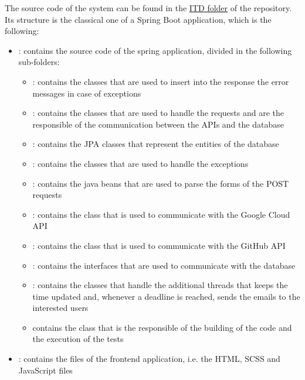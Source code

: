 The source code of the system can be found in the \href{https://github.com/pontig/sw-eng-2-PasiniPontiggiaStasi/tree/main/ITD/CodeKataBattle}{ITD folder} of the repository.\\
Its structure is the classical one of a Spring Boot application, which is the following:
\begin{itemize}
    \item {}: contains the source code of the spring application, divided in the following sub-folders:
          \begin{itemize}
              \item {}: contains the classes that are used to insert into the response the error messages in case of exceptions
              \item {}: contains the classes that are used to handle the requests and are the responsible of the communication between the APIs and the database
              \item {}: contains the JPA classes that represent the entities of the database
              \item {}: contains the classes that are used to handle the exceptions
              \item {}: contains the java beans that are used to parse the forms of the POST requests
              \item {}: contains the class that is used to communicate with the Google Cloud API
              \item {}: contains the class that is used to communicate with the GitHub API
              \item {}: contains the interfaces that are used to communicate with the database
              \item {}: contains the classes that handle the additional threads that keeps the time updated and, whenever a deadline is reached, sends the emails to the interested users
              \item {} contains the class that is the responsible of the building of the code and the execution of the tests
          \end{itemize}
    \item {}: contains the files of the frontend application, i.e. the HTML, SCSS and JavaScript files
\end{itemize}

